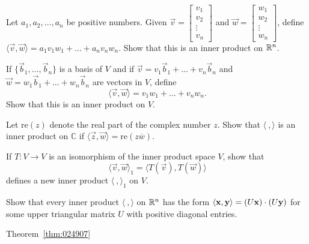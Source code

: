 \documentclass{ximera}
\begin{document}
\begin{problem}\label{ex:10_1_5}
Let $a_{1}, a_{2}, \dots, a_{n}$ be positive numbers. Given $\vec{v} = \begin{bmatrix}v_{1}\\ v_{2}\\ \vdots\\ v_{n}\end{bmatrix}$ and $\vec{w} = \begin{bmatrix}w_{1}\\ w_{2}\\ \vdots\\ w_{n}\end{bmatrix}$, define $\langle\vec{v}, \vec{w}\rangle = a_{1}v_{1}w_{1} + \dots + a_{n}v_{n}w_{n}$. Show that this is an inner product on $\mathbb{R}^n$.
\end{problem}

\begin{problem}\label{prob:inner_prod_6}
If $\{\vec{b}_{1}, \dots, \vec{b}_{n}\}$ is a basis of $V$ and if
$\vec{v} = v_1\vec{b}_1 + \dots + v_n\vec{b}_n$ and
$\vec{w} = w_1\vec{b}_1 + \dots + w_n\vec{b}_n$ are vectors in $V$, define
\begin{equation*}
\langle \vec{v}, \vec{w} \rangle = v_1w_1 + \dots + v_nw_n .
\end{equation*}
Show that this is an inner product on $V$.
\end{problem}


\begin{problem}\label{prob:inner_prod_9}
Let $\mbox{re}(z)$ denote the real part of the complex number
$z$. Show that $\langle\ , \rangle$ is an inner product on $\mathbb{C}$ if $\langle\vec{z}, \vec{w}\rangle = \mbox{re}(z\overline{w})$.
\end{problem}

\begin{problem}\label{prob:inner_prod_10}
If $T : V \to V$ is an isomorphism of the inner product space $V$, show that
\begin{equation*}
\langle \vec{v}, \vec{w} \rangle_1 = \langle T(\vec{v}), T(\vec{w}) \rangle
\end{equation*}
defines a new inner product $\langle\ , \rangle_{1}$ on $V$.
\end{problem}

\begin{problem}\label{prob:inner_prod_11}
Show that every inner product $\langle\ , \rangle$ on $\mathbb{R}^n$ has the form $\langle\mathbf{x}, \mathbf{y}\rangle = (U\mathbf{x}) \cdot (U\mathbf{y})$ for some upper triangular matrix $U$ with positive diagonal entries. 
\begin{hint}
    Theorem~\ref{thm:024907}
\end{hint}
\end{problem}
\end{document}
